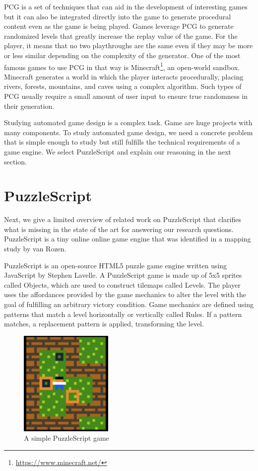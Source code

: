 PCG is a set of techniques that can aid in the development of interesting games but it can also be integrated directly into the game to generate procedural content even as the game is being played. Games leverage PCG to generate randomized levels that greatly increase the replay value of the game. For the player, it means that no two playthroughs are the same even if they may be more or less similar depending on the complexity of the generator. One of the most famous games to use PCG in that way is Minecraft\footnote{\url{https://www.minecraft.net/}}, an open-world sandbox. Minecraft generates a world in which the player interacts procedurally, placing rivers, forests, mountains, and caves using a complex algorithm. Such types of PCG usually require a small amount of user input to ensure true randomness in their generation.

Studying automated game design is a complex task. Game are huge projects with many components. To study automated game design, we need a concrete problem that is simple enough to study but still fulfills the technical requirements of a game engine. We select PuzzleScript and explain our reasoning in the next section.

\section{PuzzleScript}
Next, we give a limited overview of related work on PuzzleScript that clarifies what is missing in the state of the art for answering our research questions. PuzzleScript is a tiny online online game engine that was identified in a mapping study by van Rozen\cite{10.1145/3412843}.

PuzzleScript is an open-source HTML5 puzzle game engine written using JavaScript by Stephen Lavelle. A PuzzleScript game is made up of 5x5 sprites called Objects, which are used to construct tilemaps called Levels. The player uses the affordances provided by the game mechanics to alter the level with the goal of fulfilling an arbitrary victory condition. Game mechanics are defined using patterns that match a level horizontally or vertically called Rules. If a pattern matches, a replacement pattern is applied, transforming the level.

\begin{figure}[!t]
    \centering
    \includegraphics[width=0.40\textwidth]{images/sokoban.png}
    \caption{A simple PuzzleScript game}
    \label{fig:simple_game}
\end{figure}

